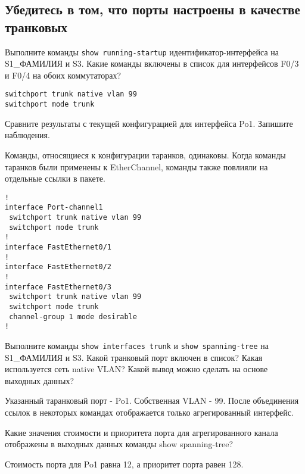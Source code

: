 \subsection{Убедитесь в том, что порты настроены в качестве транковых}

Выполните команды \verb|show running-startup| идентификатор-интерфейса
на S1\_ФАМИЛИЯ и S3.
Какие команды включены в список для интерфейсов F0/3 и F0/4
на обоих коммутаторах?

\begin{verbatim}
switchport trunk native vlan 99
switchport mode trunk
\end{verbatim}

Сравните результаты с текущей конфигурацией для интерфейса Po1.
Запишите наблюдения.

Команды, относящиеся к конфигурации таранков, одинаковы.
Когда команды таранков были применены к EtherChannel,
команды также повлияли на отдельные ссылки в пакете.

\begin{verbatim}
!
interface Port-channel1
 switchport trunk native vlan 99
 switchport mode trunk
!
interface FastEthernet0/1
!
interface FastEthernet0/2
!
interface FastEthernet0/3
 switchport trunk native vlan 99
 switchport mode trunk
 channel-group 1 mode desirable
!
\end{verbatim}

Выполните команды \verb|show interfaces trunk| и \verb|show spanning-tree|
на S1\_ФАМИЛИЯ и S3.
Какой транковый порт включен в список?
Какая используется сеть native VLAN?
Какой вывод можно сделать на основе выходных данных?

Указанный таранковый порт - Po1.
Собственная VLAN - 99.
После объединения ссылок в некоторых командах отображается только
агрегированный интерфейс.

Какие значения стоимости и приоритета порта
для агрегированного канала отображены
в выходных данных команды show spanning-tree?

Стоимость порта для Po1 равна 12, а приоритет порта равен 128.